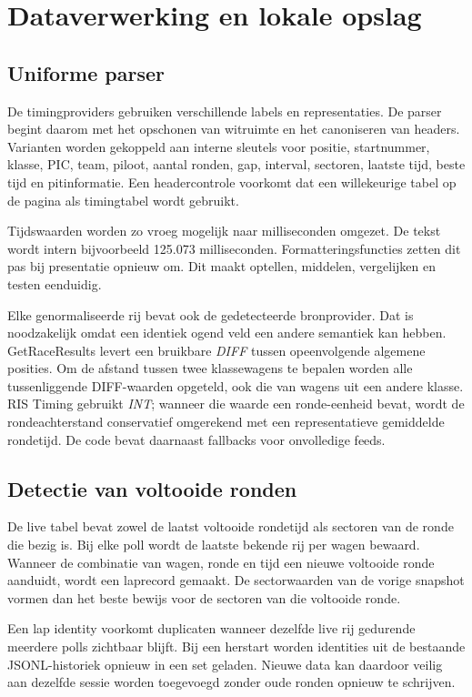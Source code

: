 \chapter{Dataverwerking en lokale opslag}
\label{chap:data}

\section{Uniforme parser}
De timingproviders gebruiken verschillende labels en representaties. De parser begint daarom met het opschonen van witruimte en het canoniseren van headers. Varianten worden gekoppeld aan interne sleutels voor positie, startnummer, klasse, PIC, team, piloot, aantal ronden, gap, interval, sectoren, laatste tijd, beste tijd en pitinformatie. Een headercontrole voorkomt dat een willekeurige tabel op de pagina als timingtabel wordt gebruikt.

Tijdswaarden worden zo vroeg mogelijk naar milliseconden omgezet. De tekst  wordt intern bijvoorbeeld 125.073 milliseconden. Formatteringsfuncties zetten dit pas bij presentatie opnieuw om. Dit maakt optellen, middelen, vergelijken en testen eenduidig.

Elke genormaliseerde rij bevat ook de gedetecteerde bronprovider. Dat is noodzakelijk omdat een identiek ogend veld een andere semantiek kan hebben. GetRaceResults levert een bruikbare \emph{DIFF} tussen opeenvolgende algemene posities. Om de afstand tussen twee klassewagens te bepalen worden alle tussenliggende DIFF-waarden opgeteld, ook die van wagens uit een andere klasse. RIS Timing gebruikt \emph{INT}; wanneer die waarde een ronde-eenheid bevat, wordt de rondeachterstand conservatief omgerekend met een representatieve gemiddelde rondetijd. De code bevat daarnaast fallbacks voor onvolledige feeds.

\section{Detectie van voltooide ronden}
De live tabel bevat zowel de laatst voltooide rondetijd als sectoren van de ronde die bezig is. Bij elke poll wordt de laatste bekende rij per wagen bewaard. Wanneer de combinatie van wagen, ronde en tijd een nieuwe voltooide ronde aanduidt, wordt een laprecord gemaakt. De sectorwaarden van de vorige snapshot vormen dan het beste bewijs voor de sectoren van die voltooide ronde.

Een lap identity voorkomt duplicaten wanneer dezelfde live rij gedurende meerdere polls zichtbaar blijft. Bij een herstart worden identities uit de bestaande JSONL-historiek opnieuw in een set geladen. Nieuwe data kan daardoor veilig aan dezelfde sessie worden toegevoegd zonder oude ronden opnieuw te schrijven.

